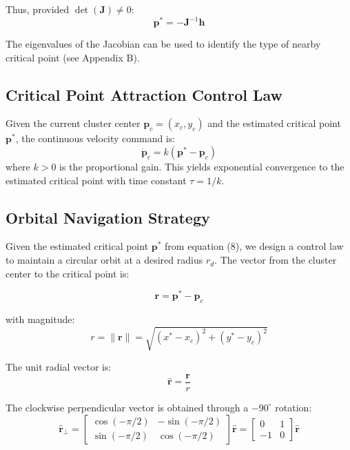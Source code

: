 \documentclass[lettersize,journal]{IEEEtran}
\begin{document}
Thus, provided $\det(\mathbf{J}) \neq 0$:
\begin{equation}
\mathbf{p}^* = -\mathbf{J}^{-1}\mathbf{h}
\end{equation}

The eigenvalues of the Jacobian can be used to identify the type of nearby critical point (see Appendix B).

\subsection{Critical Point Attraction Control Law}
Given the current cluster center $\mathbf{p}_c = (x_c, y_c)$ and the estimated critical point $\mathbf{p}^*$, the continuous velocity command is:
\begin{equation}
\dot{\mathbf{p}}_c = k(\mathbf{p}^* - \mathbf{p}_c)
\end{equation}
where $k > 0$ is the proportional gain. This yields exponential convergence to the estimated critical point with time constant $\tau = 1/k$.


\subsection{Orbital Navigation Strategy}

Given the estimated critical point $\mathbf{p}^*$ from equation (8), we design a control law to maintain a circular orbit at a desired radius $r_d$. The vector from the cluster center to the critical point is:

\begin{equation}
\mathbf{r} = \mathbf{p}^* - \mathbf{p}_c
\end{equation}

with magnitude:
\begin{equation}
r = \|\mathbf{r}\| = \sqrt{(x^* - x_c)^2 + (y^* - y_c)^2}
\end{equation}

The unit radial vector is:
\begin{equation}
\hat{\mathbf{r}} = \frac{\mathbf{r}}{r}
\end{equation}

The clockwise perpendicular vector is obtained through a $-90^\circ$ rotation:
\begin{equation}
\hat{\mathbf{r}}_\perp = \begin{bmatrix} \cos(-\pi/2) & -\sin(-\pi/2) \\ \sin(-\pi/2) & \cos(-\pi/2) \end{bmatrix} \hat{\mathbf{r}} = \begin{bmatrix} 0 & 1 \\ -1 & 0 \end{bmatrix} \hat{\mathbf{r}}
\end{equation}
\end{document}
